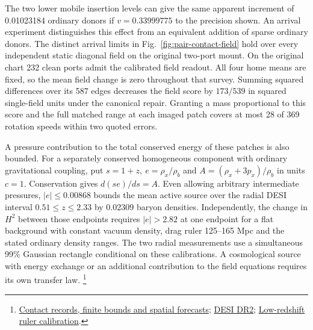 \documentclass[11pt]{article}
\begin{document}
The two lower mobile insertion levels can give the same apparent
increment of 0.01023184 ordinary donors if \(v=0.33999775\) to the
precision shown. An arrival experiment distinguishes this effect from
an equivalent addition of sparse ordinary donors. The distinct
arrival limits in Fig.~\ref{fig:pair-contact-field} hold over every
independent static diagonal field on the original two-port mount.
On the original chart 232 clean ports admit the calibrated field
readout. All four home means are fixed, so the mean field change is
zero throughout that survey. Summing squared differences over its
587 edges decreases the field score by \(173/539\) in squared
single-field units under the canonical repair. Granting a mass
proportional to this score and the full matched range at each imaged
patch covers at most 28 of 369 rotation speeds within two quoted errors.

A pressure contribution to the total conserved energy of these patches
is also bounded. For a separately conserved homogeneous component
with ordinary gravitational coupling, put \(s=1+z,\ e=\rho_x/\rho_b\)
and \(A=(\rho_x+3p_x)/\rho_b\) in units \(c=1\). Conservation gives
\(d(se)/ds=A\). Even allowing arbitrary intermediate pressures,
\(|e|\le0.00868\) bounds the mean active source over the radial DESI
interval \(0.51\le z\le2.33\) by 0.02309 baryon densities.
Independently, the change in \(H^2\) between those endpoints requires
\(|e|>2.82\) at one endpoint for a flat background with constant vacuum
density, drag ruler 125--165 Mpc and the stated ordinary density ranges.
The two radial measurements use a simultaneous 99\% Gaussian rectangle
conditional on these calibrations. A cosmological source with energy
exchange or an additional contribution to the field equations requires
its own transfer law.%
\footnote{\href{https://github.com/FloatingPragma/observer-patch-holography/blob/main/model/experiments/interval_echo_shell_flux/product_address/green_response/material_recoil/overlap_source/native_boundary/stock/aperture/PAIR_FIELD_RESULTS.md}{Contact records, finite bounds and spatial forecasts};
\href{https://arxiv.org/abs/2503.14738}{DESI DR2};
\href{https://arxiv.org/abs/2405.17643}{Low-redshift ruler calibration}.}
\end{document}
